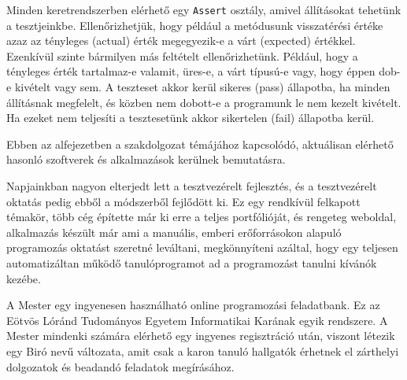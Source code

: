 Minden keretrendszerben elérhető egy \texttt{Assert} osztály, amivel állításokat tehetünk a tesztjeinkbe. Ellenőrizhetjük, hogy például a metódusunk visszatérési értéke azaz az tényleges (actual) érték megegyezik-e a várt (expected) értékkel. Ezenkívül szinte bármilyen más feltételt ellenőrizhetünk. Például, hogy a tényleges érték tartalmaz-e valamit, üres-e, a várt típusú-e vagy, hogy éppen dob-e kivételt vagy sem. A teszteset akkor kerül sikeres (pass) állapotba, ha minden állításnak megfelelt, és közben nem dobott-e a programunk le nem kezelt kivételt. Ha ezeket nem teljesíti a tesztesetünk akkor sikertelen (fail) állapotba kerül.



Ebben az alfejezetben a szakdolgozat témájához kapcsolódó, aktuálisan elérhető hasonló szoftverek és alkalmazások kerülnek bemutatásra.

Napjainkban nagyon elterjedt lett a tesztvezérelt fejlesztés, és a tesztvezérelt oktatás pedig ebből a módszerből fejlődött ki. Ez egy rendkívül felkapott témakör, több cég építette már ki erre a teljes portfólióját, és rengeteg weboldal, alkalmazás készült már ami a manuális, emberi erőforrásokon alapuló programozás oktatást szeretné leváltani, megkönnyíteni azáltal, hogy egy teljesen automatizáltan működő tanulóprogramot ad a programozást tanulni kívánók kezébe.


A Mester egy ingyenesen használható online programozási feladatbank. Ez az Eötvös Lóránd Tudományos Egyetem Informatikai Karának egyik rendszere. \cite{elte-mester} A Mester mindenki számára elérhető egy ingyenes regisztráció után, viszont létezik egy Biró nevű változata, amit csak a karon tanuló hallgatók érhetnek el zárthelyi dolgozatok és beadandó feladatok megírásához. \cite{elte-biro}

